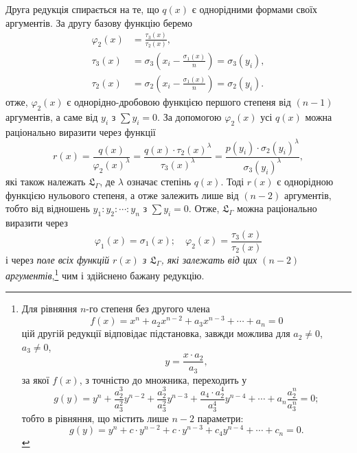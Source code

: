 \documentclass[11pt]{article}
\begin{document}
Друга редукція спирається на те, що $q(x)$ є однорідними формами своїх аргументів. За другу базову функцію беремо
\[
\begin{aligned}
\varphi_2(x)&=\frac{\tau_3(x)}{\tau_2(x)},\\
\tau_3(x)&=\sigma_3\left(x_i-\frac{\sigma_1(x)}{n}\right)=\sigma_3(y_i),\\
\tau_2(x)&=\sigma_2\left(x_i-\frac{\sigma_1(x)}{n}\right)=\sigma_2(y_i).
\end{aligned}
\]
отже, $\varphi_2(x)$ є однорідно-дробовою функцією першого степеня від $(n-1)$ аргументів, а саме від $y_i$ з $\sum y_i=0$. За допомогою $\varphi_2(x)$ усі $q(x)$ можна раціонально виразити через функції
\[
r(x)=\frac{q(x)}{\varphi_2(x)^\lambda}=\frac{q(x)\cdot\tau_2(x)^\lambda}{\tau_3(x)^\lambda}=\frac{p(y_i)\cdot\sigma_2(y_i)^\lambda}{\sigma_3(y_i)^\lambda},
\]
які також належать $\mathfrak L_\Gamma$, де $\lambda$ означає степінь $q(x)$. Тоді $r(x)$ є однорідною функцією нульового степеня, а отже залежить лише від $(n-2)$ аргументів, тобто від відношень $y_1:y_2:\cdots:y_n$ з $\sum y_i=0$. Отже, $\mathfrak L_\Gamma$ можна раціонально виразити через
\[
\varphi_1(x)=\sigma_1(x);\quad \varphi_2(x)=\frac{\tau_3(x)}{\tau_2(x)}
\]
і через \emph{поле всіх функцій $r(x)$ з $\mathfrak L_\Gamma$, які залежать від цих $(n-2)$ аргументів},\footnote{Для рівняння $n$-го степеня без другого члена
\[
f(x)=x^n+a_2x^{n-2}+a_3x^{n-3}+\cdots+a_n=0
\]
цій другій редукції відповідає підстановка, завжди можлива для $a_2\neq0$, $a_3\neq0$,
\[
y=\frac{x\cdot a_2}{a_3},
\]
за якої $f(x)$, з точністю до множника, переходить у
\[
g(y)=y^n+\frac{a_2^3}{a_3^2}y^{n-2}+\frac{a_2^3}{a_3^2}y^{n-3}+\frac{a_4\cdot a_2^4}{a_3^4}y^{n-4}+\cdots+a_n\frac{a_2^n}{a_3^n}=0;
\]
тобто в рівняння, що містить лише $n-2$ параметри:
\[
g(y)=y^n+c\cdot y^{n-2}+c\cdot y^{n-3}+c_4y^{n-4}+\cdots+c_n=0.
\]} чим і здійснено бажану редукцію.
\end{document}
